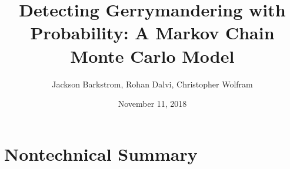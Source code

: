\documentclass[12pt]{article}
\title{Detecting Gerrymandering with Probability: A Markov Chain Monte Carlo Model}
\author{Jackson Barkstrom, Rohan Dalvi, Christopher Wolfram}
\date{November 11, 2018}
\begin{document}
\begin{titlepage}
\maketitle
\end{titlepage}


\tableofcontents
\pagebreak

\section{Nontechnical Summary}
    
\end{document}
